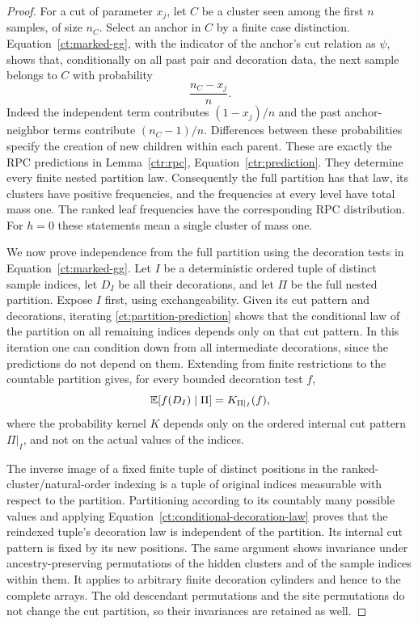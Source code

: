 \begin{proof}
For a cut of parameter $x_j$, let $C$ be a cluster seen among the
first $n$ samples, of size $n_C$.  Select an anchor in $C$ by a
finite case distinction.  Equation~\eqref{ct:marked-gg}, with
the indicator of the anchor's cut relation as $\psi$, shows that,
conditionally on all past pair and decoration data, the next
sample belongs to $C$ with probability
\begin{equation}\label{ct:partition-prediction}
                            \frac{n_C-x_j}{n}.
\end{equation}
Indeed the independent term contributes $(1-x_j)/n$ and the past
anchor-neighbor terms contribute $(n_C-1)/n$.  Differences between
these probabilities specify the creation of new children within
each parent.  These are exactly the RPC predictions in
Lemma~\ref{ctr:rpc}, Equation~\eqref{ctr:prediction}.  They determine every
finite nested
partition law.  Consequently the full partition has that law, its
clusters have positive frequencies, and the frequencies at every
level have total mass one.  The ranked leaf frequencies have the
corresponding RPC distribution.  For $h=0$ these statements mean a
single cluster of mass one.

We now prove independence from the full partition using the decoration
tests in Equation~\eqref{ct:marked-gg}.  Let $I$ be a deterministic
ordered tuple of distinct sample indices, let $D_I$ be all their
decorations, and let $\Pi$ be the full nested partition.  Expose $I$
first, using exchangeability.  Given its cut pattern and decorations,
iterating \eqref{ct:partition-prediction} shows that the conditional
law of the partition on all remaining indices depends only on that
cut pattern.  In this iteration one can condition down from all
intermediate decorations, since the predictions do not depend on them.
Extending from finite restrictions to the countable partition gives,
for every bounded decoration test $f$,
\begin{equation}\label{ct:conditional-decoration-law}
 \mathbb E[f(D_I)\mid\Pi]=K_{\Pi|_I}(f),
\end{equation}
where the probability kernel $K$ depends only on the ordered internal
cut pattern $\Pi|_I$, and not on the actual values of the indices.

The inverse image of a fixed finite tuple of distinct positions in
the ranked-cluster/natural-order indexing is a tuple of original
indices measurable with respect to the partition.  Partitioning
according to its countably many possible values and applying
Equation~\eqref{ct:conditional-decoration-law} proves that the reindexed tuple's decoration
law is independent of the partition.  Its internal cut pattern is
fixed by its new positions.  The same argument shows invariance
under ancestry-preserving permutations of the hidden clusters and
of the sample indices within them.  It applies to arbitrary finite
decoration cylinders and hence to the complete arrays.  The old
descendant permutations and the site permutations do not change
the cut partition, so their invariances are retained as well.
\end{proof}

